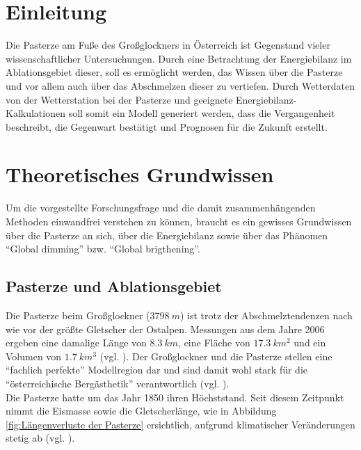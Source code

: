 \documentclass[12pt,a4paper]{article}
\begin{document}
\pagebreak
\ofoot{{\small \pagemark}}
\tableofcontents
\vspace{1cm}

\pagebreak
\listoffigures
\vspace{1cm}

\pagebreak
\listoftables
\vspace{1cm}


\pagebreak
{}  
\setcounter{page}{1}

\section{Einleitung}
Die Pasterze am Fuße des Großglockners in Österreich ist Gegenstand vieler wissenschaftlicher Untersuchungen. Durch eine Betrachtung der Energiebilanz im Ablationsgebiet dieser, soll es ermöglicht werden, das Wissen über die Pasterze und vor allem auch über das Abschmelzen dieser zu vertiefen. Durch Wetterdaten von der Wetterstation bei der Pasterze und geeignete Energiebilanz-Kalkulationen soll somit ein Modell generiert werden, dass die Vergangenheit beschreibt, die Gegenwart bestätigt und Prognosen für die Zukunft erstellt.


\section{Theoretisches Grundwissen}
Um die vorgestellte Forschungsfrage und die damit zusammenhängenden Methoden einwandfrei verstehen zu können, braucht es ein gewisses Grundwissen über die Pasterze an sich, über die Energiebilanz sowie über das Phänomen ``Global dimming'' bzw. ``Global brigthening''.

\subsection{Pasterze und Ablationsgebiet}
Die Pasterze beim Großglockner ($3798~m$) ist trotz der Abschmelztendenzen nach wie vor der größte Gletscher der Ostalpen. Messungen aus dem Jahre 2006 ergeben eine damalige Länge von $8.3~km$, eine Fläche von $17.3~km^2$ und ein Volumen von $1.7~km^3$ (vgl. \cite[10]{Pasterze}). Der Großglockner und die Pasterze stellen eine ``fachlich perfekte'' Modellregion dar und sind damit wohl stark für die ``österreichische Bergästhetik'' verantwortlich (vgl. \cite[13]{Pasterze}).\\
Die Pasterze hatte um das Jahr 1850 ihren Höchststand. Seit diesem Zeitpunkt nimmt die Eismasse sowie die Gletscherlänge, wie in Abbildung \ref{fig:Längenverluste der Pasterze} ersichtlich, aufgrund klimatischer Veränderungen stetig ab (vgl. \cite[17]{Pasterze}).\\
\end{document}
